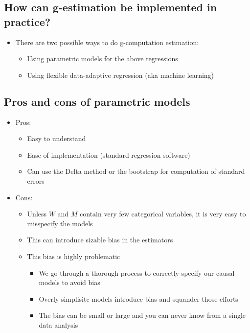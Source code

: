\documentclass[
  12pt,
]{book}
\providecommand{\tightlist}{%
  \setlength{\itemsep}{0pt}\setlength{\parskip}{0pt}}
\theoremstyle{definition}
\theoremstyle{definition}
\theoremstyle{definition}
\newcommand{\1}{\mathbbm{1}}
\begin{document}
\hypertarget{how-can-g-estimation-be-implemented-in-practice}{%
\subsection{How can g-estimation be implemented in practice?}\label{how-can-g-estimation-be-implemented-in-practice}}

\begin{itemize}
\tightlist
\item
  There are two possible ways to do g-computation estimation:

  \begin{itemize}
  \tightlist
  \item
    Using parametric models for the above regressions
  \item
    Using flexible data-adaptive regression (aka machine learning)
  \end{itemize}
\end{itemize}

\hypertarget{pros-and-cons-of-parametric-models}{%
\subsection{Pros and cons of parametric models}\label{pros-and-cons-of-parametric-models}}

\begin{itemize}
\tightlist
\item
  Pros:

  \begin{itemize}
  \tightlist
  \item
    Easy to understand
  \item
    Ease of implementation (standard regression software)
  \item
    Can use the Delta method or the bootstrap for computation of standard errors
  \end{itemize}
\item
  Cons:

  \begin{itemize}
  \tightlist
  \item
    Unless \(W\) and \(M\) contain very few categorical variables, it is very easy
    to misspecify the models
  \item
    This can introduce sizable bias in the estimators
  \item
    This bias is highly problematic

    \begin{itemize}
    \tightlist
    \item
      We go through a thorough process to correctly specify our causal models to
      avoid bias
    \item
      Overly simplisitc models introduce bias and squander those efforts
    \item
      The bias can be small or large and you can never know from a single data
      analysis
    \end{itemize}
  \end{itemize}
\end{itemize}
\end{document}
